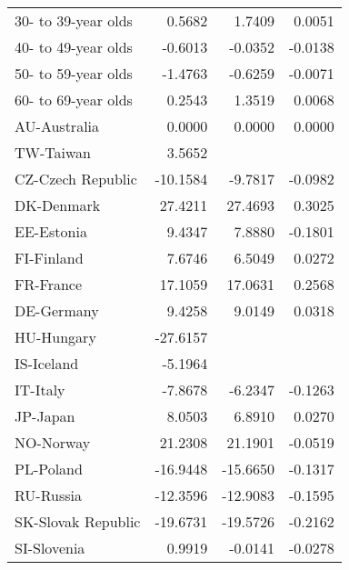 \begin{table}[htbp]
\begin{tabular}{l*{3}{D{.}{.}{-0.5}}}
30- to 39-year olds &      0.5682         &      1.7409\sym{*}  &      0.0051         \\
40- to 49-year olds &     -0.6013         &     -0.0352         &     -0.0138         \\
50- to 59-year olds &     -1.4763\sym{*}  &     -0.6259         &     -0.0071         \\
60- to 69-year olds &      0.2543         &      1.3519         &      0.0068         \\
AU-Australia        &      0.0000         &      0.0000         &      0.0000         \\
TW-Taiwan           &      3.5652\sym{***}&                     &                     \\
CZ-Czech Republic   &    -10.1584\sym{***}&     -9.7817\sym{***}&     -0.0982\sym{***}\\
DK-Denmark          &     27.4211\sym{***}&     27.4693\sym{***}&      0.3025\sym{***}\\
EE-Estonia          &      9.4347\sym{***}&      7.8880\sym{***}&     -0.1801\sym{***}\\
FI-Finland          &      7.6746\sym{***}&      6.5049\sym{***}&      0.0272         \\
FR-France           &     17.1059\sym{***}&     17.0631\sym{***}&      0.2568\sym{***}\\
DE-Germany          &      9.4258\sym{***}&      9.0149\sym{***}&      0.0318         \\
HU-Hungary          &    -27.6157\sym{***}&                     &                     \\
IS-Iceland          &     -5.1964\sym{***}&                     &                     \\
IT-Italy            &     -7.8678\sym{***}&     -6.2347\sym{***}&     -0.1263\sym{***}\\
JP-Japan            &      8.0503\sym{***}&      6.8910\sym{***}&      0.0270         \\
NO-Norway           &     21.2308\sym{***}&     21.1901\sym{***}&     -0.0519\sym{***}\\
PL-Poland           &    -16.9448\sym{***}&    -15.6650\sym{***}&     -0.1317\sym{***}\\
RU-Russia           &    -12.3596\sym{***}&    -12.9083\sym{***}&     -0.1595\sym{***}\\
SK-Slovak Republic  &    -19.6731\sym{***}&    -19.5726\sym{***}&     -0.2162\sym{***}\\
SI-Slovenia         &      0.9919         &     -0.0141         &     -0.0278         \\

\end{tabular}
\end{table}
